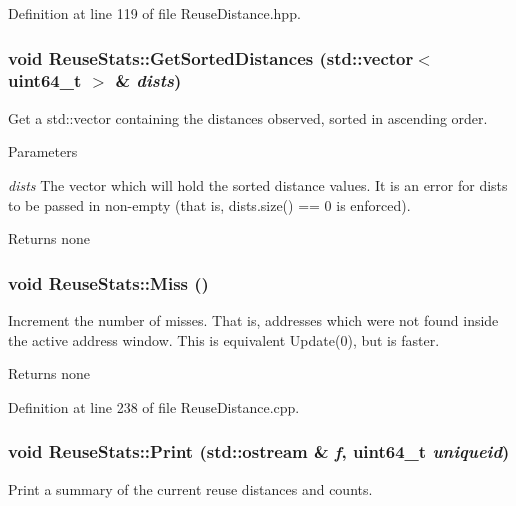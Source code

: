 Definition at line 119 of file ReuseDistance.hpp.

\hypertarget{class_reuse_stats_adcb657e303c090ac5ef210f6c4506986}{
\subsubsection[{GetSortedDistances}]{\setlength{\rightskip}{0pt plus 5cm}void ReuseStats::GetSortedDistances (std::vector$<$ uint64\_\-t $>$ \& {\em dists})}}
\label{class_reuse_stats_adcb657e303c090ac5ef210f6c4506986}
Get a std::vector containing the distances observed, sorted in ascending order.


\begin{DoxyParams}{Parameters}
\item[{\em dists}]The vector which will hold the sorted distance values. It is an error for dists to be passed in non-\/empty (that is, dists.size() == 0 is enforced).\end{DoxyParams}
\begin{DoxyReturn}{Returns}
none 
\end{DoxyReturn}
\hypertarget{class_reuse_stats_a3d963a3b6c2c0b37b23d4e0723a70831}{
\subsubsection[{Miss}]{\setlength{\rightskip}{0pt plus 5cm}void ReuseStats::Miss ()}}
\label{class_reuse_stats_a3d963a3b6c2c0b37b23d4e0723a70831}
Increment the number of misses. That is, addresses which were not found inside the active address window. This is equivalent Update(0), but is faster.

\begin{DoxyReturn}{Returns}
none 
\end{DoxyReturn}


Definition at line 238 of file ReuseDistance.cpp.

\hypertarget{class_reuse_stats_a9edd9703b7de1998042cd5f72056d68a}{
\subsubsection[{Print}]{\setlength{\rightskip}{0pt plus 5cm}void ReuseStats::Print (std::ostream \& {\em f}, \/  uint64\_\-t {\em uniqueid})}}
\label{class_reuse_stats_a9edd9703b7de1998042cd5f72056d68a}
Print a summary of the current reuse distances and counts.


